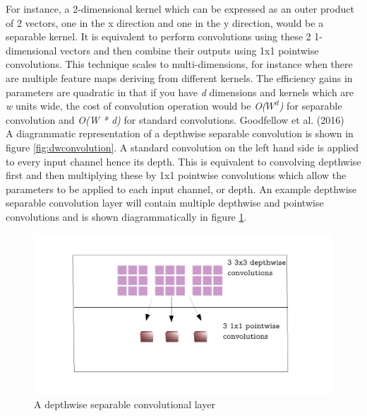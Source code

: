 \documentclass{article}
\begin{document}
For instance, a 2-dimensional kernel which can be expressed as an outer product of 2 vectors, one in the x direction and one in the y direction, would be a separable kernel. It is equivalent to perform convolutions using these 2 1-dimensional vectors and then combine their outputs using 1x1 pointwise convolutions. This technique scales to multi-dimensions, for instance when there are multiple feature maps deriving from different kernels. The efficiency gains in parameters are quadratic in that if you have \emph{d} dimensions and kernels which are \emph{w} units wide, the cost of convolution operation would be \emph{O($W^d$)} for separable convolution and \emph{O(W * d)} for standard convolutions. Goodfellow et al. (2016) \\

A diagrammatic representation of a depthwise separable convolution is shown in figure \ref{fig:dwconvolution}. A standard convolution on the left hand side is applied to every input channel hence its depth. This is equivalent to convolving depthwise first and then multiplying these by 1x1 pointwise convolutions which allow the parameters to be applied to each input channel, or depth. An example depthwise separable convolution layer will contain multiple depthwise and pointwise convolutions and is shown diagrammatically in figure \ref{fig:dwconvolutionlayer}.\\

\begin{figure}[h]
  \includegraphics[width=\linewidth]{dwlayer.pdf}
  \caption{A depthwise separable convolutional layer}
  \label{fig:dwconvolutionlayer}
\end{figure}
\end{document}
